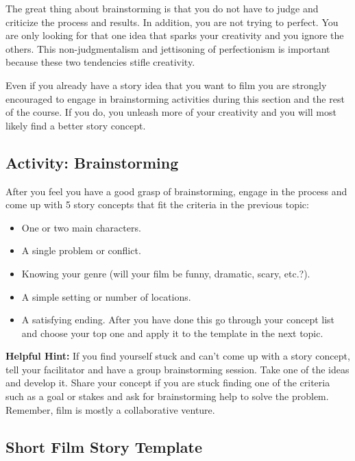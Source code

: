 \documentclass[
]{book}
\providecommand{\tightlist}{%
  \setlength{\itemsep}{0pt}\setlength{\parskip}{0pt}}
\begin{document}
The great thing about brainstorming is that you do not have to judge and criticize the process and results. In addition, you are not trying to perfect. You are only looking for that one idea that sparks your creativity and you ignore the others. This non-judgmentalism and jettisoning of perfectionism is important because these two tendencies stifle creativity.

Even if you already have a story idea that you want to film you are strongly encouraged to engage in brainstorming activities during this section and the rest of the course. If you do, you unleash more of your creativity and you will most likely find a better story concept.

\hypertarget{activity-brainstorming}{%
\subsection*{Activity: Brainstorming}\label{activity-brainstorming}}

\begin{reflect}
After you feel you have a good grasp of brainstorming, engage in the process and come up with 5 story concepts that fit the criteria in the previous topic:

\begin{itemize}
\tightlist
\item
  One or two main characters.
\item
  A single problem or conflict.
\item
  Knowing your genre (will your film be funny, dramatic, scary, etc.?).
\item
  A simple setting or number of locations.
\item
  A satisfying ending. After you have done this go through your concept list and choose your top one and apply it to the template in the next topic.
\end{itemize}

\textbf{Helpful Hint:} If you find yourself stuck and can't come up with a story concept, tell your facilitator and have a group brainstorming session. Take one of the ideas and develop it. Share your concept if you are stuck finding one of the criteria such as a goal or stakes and ask for brainstorming help to solve the problem. Remember, film is mostly a collaborative venture.
\end{reflect}

\hypertarget{short-film-story-template}{%
\subsection*{Short Film Story Template}\label{short-film-story-template}}
\end{document}
